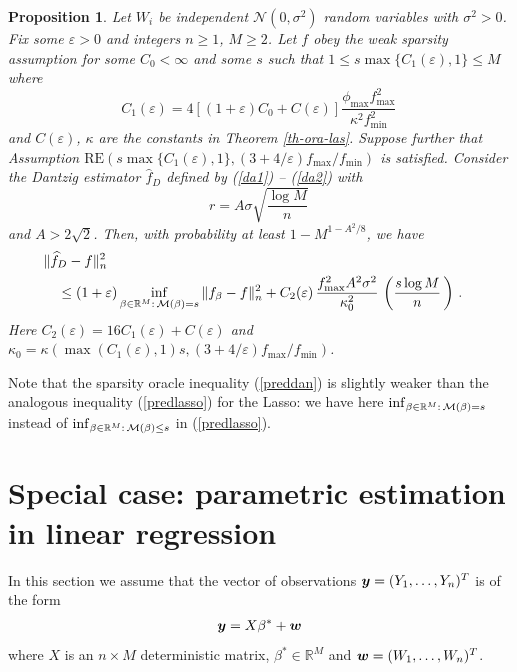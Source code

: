 \documentclass[dvips,aos]{imsart}
\numberwithin{equation}{section}
\theoremstyle{plain}
\newtheorem{proposition}[thm]{Proposition}%
\def\sf{}
\def\wideth{\widehat}
\def\scm{{\cal M}}
\def\eps{\varepsilon}
\def\RR{\mathbb R}
\def\RE#1#2{$\text{RE}(#1,#2)$}
\newcommand{\bb}{\mbox{\boldmath$\beta$}}
\def\bb{\beta}
\newcommand{\bmy}{\mbox{\boldmath$y$}}
\newcommand{\bmw}{\mbox{\boldmath$w$}}
\begin{document}
\begin{proposition}\label{th-ora-dan}
Let  $W_i$ be independent ${\mathcal N}(0,\sigma^2)$ random
variables with $\sigma^2>0$. Fix some $\eps>0$ and integers $n\ge1$,
$M\ge2$. Let $f$ obey the weak sparsity assumption for some
$C_0<\infty$ and some $s$ such that $1\le  s\max \{C_1(\eps),1\} \le
M$ where
$$
C_1(\eps)=4\left[(1+\eps)C_0 + C(\eps)\right]
\frac{\phi_{\max}f_{\max}^2}{\kappa^2 f_{\min}^{2}}\,
$$
and $C(\eps)$, $\kappa$ are the constants in Theorem
\ref{th-ora-las}. Suppose further that Assumption \RE {s\max
\{C_1(\eps),1\}}{(3+4/\eps)f_{\max}/f_{\min}} is satisfied. Consider
the Dantzig estimator $\wideth{f}_D$ defined by (\ref{da1}) --
(\ref{da2}) with
$$
r= A\sigma \sqrt{\frac{\log M}{n}}\,
$$
and $A>2\sqrt{2}$. Then, with probability at least $1-M^{1-A^2/8}$,
we have
\begin{equation}\label{preddan}
\begin{split}
&\hspace{-1em}\| \wideth f_D -f\|_n^2
\\
&\le (1+\eps)
\inf_{\beta\in\RR^M:\,\scm(\beta)=s}\| {\sf f}_\beta -f \|_n^2 +
C_2(\eps)\,\frac{f_{\max}^2A^2 \sigma^2}{\kappa_0^2}\,
\left(\frac{s\log M}{n}\,\right)\,.
\end{split}
\end{equation}
Here $C_2(\eps)=16 C_1(\eps)+ C(\eps)$ and $\kappa_0= \kappa(\max
(C_1(\eps),1)s, (3+4/\eps)f_{\max}/f_{\min})$.
\end{proposition}





Note that the sparsity oracle inequality (\ref{preddan}) is slightly
weaker than the analogous inequality (\ref{predlasso}) for the
Lasso: we have here $\inf_{\beta\in\RR^M:\,\scm(\beta)=s}$ instead
of $\inf_{\beta\in\RR^M:\,\scm(\beta)\le s}$ in (\ref{predlasso}).



\section{Special case: parametric estimation in linear regression}
\label{sec6}

In this section we assume that the vector of observations
$\bmy=(Y_1,\dots,Y_n)^T$ is of the form
\begin{equation}\begin{split}\label{linmod}
\bmy=X\bb^*+ \bmw
\end{split}\end{equation}
where $X$ is an $n\times M$ deterministic matrix, $\bb^*\in\RR^M$ and
$\bmw=(W_1,\dots,W_n)^T$.
\end{document}
